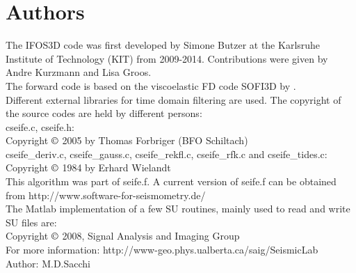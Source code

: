 \documentclass[12pt,twoside,a4paper]{report}
\numberwithin{equation}{chapter}
\numberwithin{figure}{chapter}
\numberwithin{table}{chapter}
\begin{document}


\FloatBarrier
\newpage 
\thispagestyle{empty}
\quad 
\newpage

\pagestyle{fancy}
%



\section*{Authors}

The IFOS3D code was first developed by Simone Butzer at the Karlsruhe Institute of Technology (KIT) from 2009-2014. Contributions were given by Andre Kurzmann and Lisa Groos.\\
\newline
The forward code is based on the viscoelastic FD code SOFI3D by \cite{boh02}.\\
\newline
Different external libraries for time domain filtering are used. The copyright of the source codes are held by different persons:\\
\newline
cseife.c, cseife.h:\\ 
Copyright $\copyright$ 2005 by Thomas Forbriger (BFO Schiltach) \\
\newline
cseife\_deriv.c, cseife\_gauss.c, cseife\_rekfl.c, cseife\_rfk.c and cseife\_tides.c:\\
Copyright $\copyright$ 1984 by Erhard Wielandt\\
This algorithm was part of seife.f. A current version of seife.f can be obtained from http://www.software-for-seismometry.de/\\
\newline 
The Matlab implementation of a few SU routines, mainly used to read and write SU files are:\\
Copyright $\copyright$ 2008, Signal Analysis and Imaging Group\\
For more information: http://www-geo.phys.ualberta.ca/saig/SeismicLab\\
Author: M.D.Sacchi\\
\newline

\end{document}
